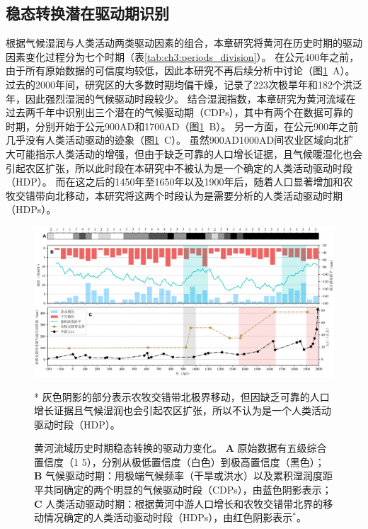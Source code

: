 
\subsection{稳态转换潜在驱动期识别}

根据气候湿润与人类活动两类驱动因素的组合，本章研究将黄河在历史时期的驱动因素变化过程分为七个时期（表\ref{tab:ch3:periods_division}）。
在公元400年之前，由于所有原始数据的可信度均较低，因此本研究不再后续分析中讨论（图\ref{fig:ch3:drivers}~A）。
过去的2000年间，研究区的大多数时期均偏干燥，记录了223次极旱年和182个洪泛年，因此强烈湿润的气候驱动时段较少。
结合湿润指数，本章研究为黄河流域在过去两千年中识别出三个潜在的气候驱动期（CDPs），其中有两个在数据可靠的时期，分别开始于公元900AD和1700AD（图\ref{fig:ch3:drivers}~B）。
另一方面，在公元900年之前几乎没有人类活动驱动的迹象（图\ref{fig:ch3:drivers}~C）。
虽然900AD\textendash{}1000AD间农业区域向北扩大可能指示人类活动的增强，但由于缺乏可靠的人口增长证据，且气候暖湿化也会引起农区扩张，所以此时段在本研究中不被认为是一个确定的人类活动驱动时段（HDP）。
而在这之后的1450年至1650年以及1900年后，随着人口显著增加和农牧交错带向北移动，本研究将这两个时段认为是需要分析的人类活动驱动时期（HDPs）。



\begin{figure}[!ht]
    \includegraphics[width=\textwidth]{img/ch3/ch3_drivers.png}
    \caption[黄河流域历史时期稳态转换的驱动力变化]{黄河流域历史时期稳态转换的驱动力变化。
    \textbf{A} 原始数据有五级综合置信度（1 \textendash{} 5），分别从极低置信度（白色）到极高置信度（黑色）；
    \textbf{B} 气候驱动时期：用极端气候频率（干旱或洪水）以及累积湿润度距平共同确定的两个明显的气候驱动时段（CDPs），由蓝色阴影表示；
    \textbf{C} 人类活动驱动时期：根据黄河中游人口增长和农牧交错带北界的移动情况确定的人类活动驱动时段（HDPs），由红色阴影表示$^*$。}
    \footnotesize
    * 灰色阴影的部分表示农牧交错带北极界移动，但因缺乏可靠的人口增长证据且气候湿润也会引起农区扩张，所以不认为是一个人类活动驱动时段（HDP）。\label{fig:ch3:drivers}
\end{figure}

